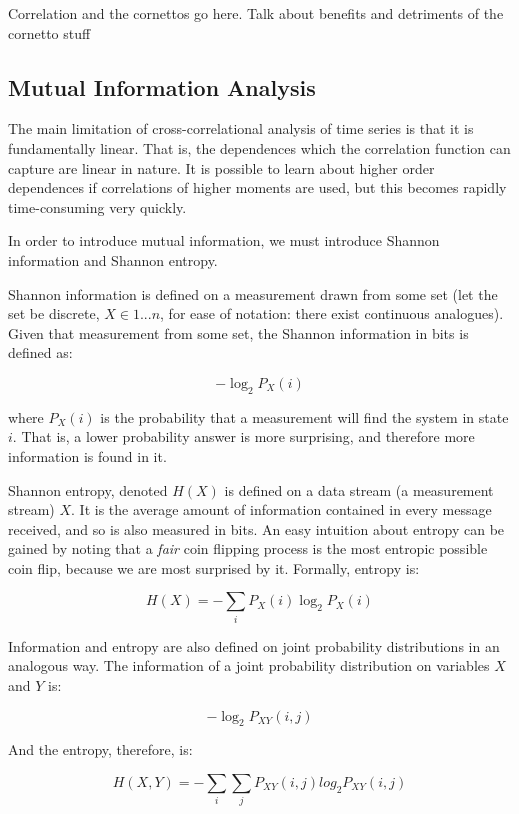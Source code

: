 \documentclass[12pt]{article}
\begin{document}
Correlation and the cornettos go here. Talk about benefits and detriments of the cornetto stuff


\subsection{Mutual Information Analysis}

The main limitation of cross-correlational analysis of time series is that it is fundamentally linear. That is, the dependences which the correlation function can capture are linear in nature. It is possible to learn about higher order dependences if correlations of higher moments are used, but this becomes rapidly time-consuming very quickly. %

In order to introduce mutual information, we must introduce Shannon information and Shannon entropy.

Shannon information is defined on a measurement drawn from some set (let the set be discrete, $X \in {1 ... n}$, for ease of notation: there exist continuous analogues). Given that measurement from some set, the Shannon information in bits is defined as:

$$ -\log_2 P_X(i) $$

where $P_X(i)$ is the probability that a measurement will find the system in state $i$. That is, a lower probability answer is more surprising, and therefore more information is found in it.

Shannon entropy, denoted $H(X)$ is defined on a data stream (a measurement stream) $X$. It is the average amount of information contained in every message received, and so is also measured in bits. An easy intuition about entropy can be gained by noting that a \emph{fair} coin flipping process is the most entropic possible coin flip, because we are most surprised by it. Formally, entropy is:

$$H(X) = -\sum_i P_X(i) \log_2 P_X(i)$$

Information and entropy are also defined on joint probability distributions in an analogous way. The information of a joint probability distribution on variables $X$ and $Y$ is:

$$ -\log_2 P_{XY}(i, j) $$

And the entropy, therefore, is:

$$H(X, Y) = -\sum_i \sum_j P_{XY}(i, j) log_2 P_{XY}(i, j)$$
\end{document}
